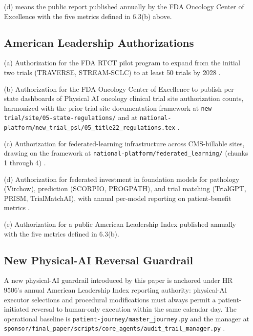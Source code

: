 (d)  means the public report
published annually by the FDA Oncology Center of Excellence with
the five metrics defined in 6.3(b) above.

\subsection{American Leadership Authorizations}

\hspace{0.5cm} (a) Authorization for the FDA RTCT pilot program to expand from the
initial two trials (TRAVERSE, STREAM-SCLC) to at least 50 trials by
2028 \cite{fda_rtct_press_2026}.

(b) Authorization for the FDA Oncology Center of Excellence to
publish per-state dashboards of Physical AI oncology clinical trial site
authorization counts, harmonized with the prior trial site documentation
framework at
\texttt{new-trial/site/05-state-regulations/} and at
\texttt{national-platform/new\_trial\_psl/05\_title22\_regulations.tex}
\cite{kawchak_2026_19176370, kawchak_2026_19244918}.

(c) Authorization for federated-learning infrastructure across CMS-billable sites, drawing on the framework at
\texttt{national-platform/federated\_learning/} (chunks 1 through 4)
\cite{kawchak_2026_19244918}.

(d) Authorization for federated investment in foundation models for
pathology (Virchow), prediction (SCORPIO, PROGPATH), and trial
matching (TrialGPT, PRISM, TrialMatchAI), with annual per-model
reporting on patient-benefit metrics \cite{vorontsov2024virchow,
jin2024trialgpt, gupta2024prism, abdallah2026trialmatchai}.

(e) Authorization for a public American Leadership Index published
annually with the five metrics defined in 6.3(b).

\subsection{New Physical-AI Reversal Guardrail}

\hspace{0.5cm} A new physical-AI guardrail introduced by this paper is anchored
under HR 9506's annual American Leadership Index reporting
authority: physical-AI executor selections and procedural
modifications must always permit a patient-initiated reversal to
human-only execution within the same calendar day. The operational
baseline is \texttt{patient-journey/master\_journey.py} and the manager at
\texttt{sponsor/final\_paper/scripts/core\_agents/audit\_trail\_manager.py}
\cite{kawchak_2026_19119939, kawchak_2026_19396256}.

